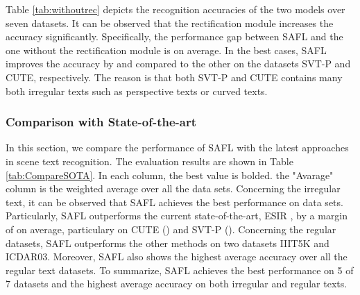 Table \ref{tab:withoutrec} depicts the recognition accuracies of the two models over seven datasets. It can be observed that the rectification module increases the accuracy significantly. Specifically, the performance gap between SAFL and the one without the rectification module is  on average. 
In the best cases, SAFL improves the accuracy by  and  compared to the other on the datasets SVT-P and CUTE, respectively.
The reason is that both SVT-P and CUTE contains many both irregular texts such as perspective texts or curved texts. 

\subsubsection{Comparison with State-of-the-art}
In this section, we compare the performance of SAFL with the latest approaches in scene text recognition. 
The evaluation results are shown in Table \ref{tab:CompareSOTA}.
In each column, the best value is bolded. 
the "Avarage" column is the weighted average over all the data sets. 
Concerning the irregular text, it can be observed that SAFL achieves the best performance on  data sets. 
Particularly, SAFL outperforms the current state-of-the-art, ESIR \cite{zhan2019esir}, by a margin of  on average, particulary on CUTE () and SVT-P ().
Concerning the regular datasets, SAFL outperforms the other methods on two datasets IIIT5K and ICDAR03. Moreover, SAFL also shows the highest average accuracy over all the regular text datasets. To summarize, SAFL achieves the best performance on 5 of 7 datasets and the highest average accuracy on both irregular and regular texts. 
